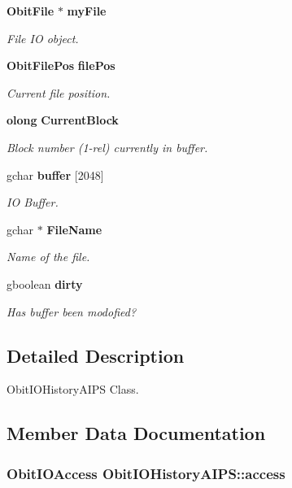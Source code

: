 \begin{CompactItemize}
{\bf Obit\-File} $\ast$ {\bf my\-File}
\begin{CompactList}\small\item\em File IO object. \item\end{CompactList}\item 
{\bf Obit\-File\-Pos} {\bf file\-Pos}
\begin{CompactList}\small\item\em Current file position. \item\end{CompactList}\item 
{\bf olong} {\bf Current\-Block}
\begin{CompactList}\small\item\em Block number (1-rel) currently in buffer. \item\end{CompactList}\item 
gchar {\bf buffer} [2048]
\begin{CompactList}\small\item\em IO Buffer. \item\end{CompactList}\item 
gchar $\ast$ {\bf File\-Name}
\begin{CompactList}\small\item\em Name of the file. \item\end{CompactList}\item 
gboolean {\bf dirty}
\begin{CompactList}\small\item\em Has buffer been modofied? \item\end{CompactList}\end{CompactItemize}


\subsection{Detailed Description}
Obit\-IOHistory\-AIPS Class. 



\subsection{Member Data Documentation}
\subsubsection{\setlength{\rightskip}{0pt plus 5cm}Obit\-IOAccess {\bf Obit\-IOHistory\-AIPS::access}}\label{structObitIOHistoryAIPS_o4}


